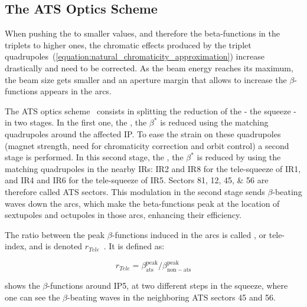 \subsection{The ATS Optics Scheme}
\label{subsection:lhc_ats_optics_scheme}

When pushing the  to smaller values, and therefore the \glspl{beta-function} in the triplets to higher ones, the chromatic effects produced by the triplet quadrupoles~(\cref{equation:natural_chromaticity_approximation}) increase drastically and need to be corrected.
As the beam energy reaches its maximum, the beam size gets smaller and an aperture margin that allows to increase the \(\beta\)-functions appears in the arcs.

The \gls{ATS} optics scheme~\cite{CERN:Fartoukh:ATS_Report,PRAB:Fartoukh:Achromatic_Telescopic_Squeeze,IPAC:Pojer:LHC_ATS_Experience} consists in splitting the reduction of the  - the squeeze - in two stages.
In the first one, the , the \(\beta^{\ast}\) is reduced using the matching quadrupoles around the affected IP.
To ease the strain on these quadrupoles (magnet strength, need for chromaticity correction and orbit control) a second stage is performed.
In this second stage, the , the \(\beta^{\ast}\) is reduced by using the matching quadrupoles in the nearby IRs: IR\num{2} and IR\num{8} for the tele-squeeze of IR\num{1}, and IR\num{4} and IR\num{6} for the tele-squeeze of IR\num{5}.
Sectors \numlist{81;12;45;56} are therefore called ATS sectors.
This modulation in the second stage sends \(\beta\)-beating waves down the arcs, which make the \glspl{beta-function} peak at the location of sextupoles and octupoles in those arcs, enhancing their efficiency.

The ratio between the peak \(\beta\)-functions induced in the arcs is called , or tele-index, and is denoted \(r_{Tele}\)~\cite{CERN:Fartoukh:Round_Telescopic_Optics_LHC_Large_Telescopic_Index}.
It is defined as:

\begin{equation}
  r_{Tele} = \beta^{\mathrm{peak}}_{\mathrm{ats}} / \beta^{\mathrm{peak}}_{\mathrm{non-ats}}
  \label{equation:tele_index}
\end{equation}

 shows the \(\beta\)-functions around IP\num{5}, at two different steps in the squeeze, where one can see the \(\beta\)-beating waves in the neighboring ATS sectors \num{45} and \num{56}.

